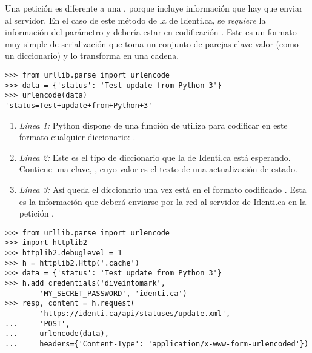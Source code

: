 Una petición  es diferente a una , porque incluye información que hay que enviar al servidor. En el caso de este método de la  de Identi.ca, se \emph{requiere} la información del parámetro  y debería estar en codificación . Este es un formato muy simple de serialización que toma un conjunto de parejas clave-valor (como un diccionario) y lo transforma en una cadena.

\noindent\begin{minipage}{\textwidth}
\begin{lstlisting}[mathescape=True]
>>> from urllib.parse import urlencode 
>>> data = {'status': 'Test update from Python 3'}
>>> urlencode(data)                              
'status=Test+update+from+Python+3'
\end{lstlisting}
\end{minipage}

\begin{enumerate}

\item \emph{Línea 1:} Python dispone de una función de utiliza para codificar en este formato cualquier diccionario: .

\item \emph{Línea 2:} Este es el tipo de diccionario que la  de Identi.ca está esperando. Contiene una clave, , cuyo valor es el texto de una actualización de estado.

\item \emph{Línea 3:} Así queda el diccionario una vez está en el formato codificado . Esta es la información que deberá enviarse por la red al servidor de Identi.ca en la petición .

\end{enumerate}

\noindent\begin{minipage}{\textwidth}
\begin{lstlisting}[mathescape=True]
>>> from urllib.parse import urlencode
>>> import httplib2
>>> httplib2.debuglevel = 1
>>> h = httplib2.Http('.cache')
>>> data = {'status': 'Test update from Python 3'}
>>> h.add_credentials('diveintomark', 
        'MY_SECRET_PASSWORD', 'identi.ca')
>>> resp, content = h.request(
        'https://identi.ca/api/statuses/update.xml',
...     'POST',    
...     urlencode(data),
...     headers={'Content-Type': 'application/x-www-form-urlencoded'})
\end{lstlisting}
\end{minipage}

